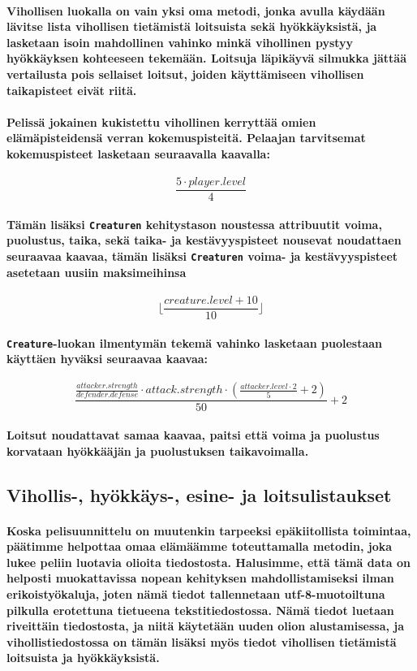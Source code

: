 \documentclass[10pt,a4paper,draft]{article}
\begin{document}
\paragraph{Vihollisen luokalla on vain yksi oma metodi, jonka avulla käydään lävitse lista vihollisen tietämistä loitsuista sekä hyökkäyksistä, ja lasketaan isoin mahdollinen vahinko minkä vihollinen pystyy hyökkäyksen kohteeseen tekemään. Loitsuja läpikäyvä silmukka jättää vertailusta pois sellaiset loitsut, joiden käyttämiseen vihollisen taikapisteet eivät riitä.}
\newpage
\paragraph{Pelissä jokainen kukistettu vihollinen kerryttää omien elämäpisteidensä verran kokemuspisteitä. Pelaajan tarvitsemat kokemuspisteet lasketaan seuraavalla kaavalla:}
\[\frac{5\cdot player.level}{4}\]
\paragraph{Tämän lisäksi \texttt{Creaturen} kehitystason noustessa attribuutit voima, puolustus, taika, sekä taika- ja kestävyyspisteet nousevat noudattaen seuraavaa kaavaa, tämän lisäksi \texttt{Creaturen} voima- ja kestävyyspisteet asetetaan uusiin maksimeihinsa}
\[\lfloor\frac{creature.level+10}{10}\rfloor\]
\paragraph{\texttt{Creature}-luokan ilmentymän tekemä vahinko lasketaan puolestaan käyttäen hyväksi seuraavaa kaavaa:}
\[\frac{\frac{attacker.strength}{defender.defense} \cdot attack.strength \cdot (\frac{attacker.level \cdot 2}{5}+2)}{50}+2\]
\paragraph{Loitsut noudattavat samaa kaavaa, paitsi että voima ja puolustus korvataan hyök\-kää\-jän ja puolustuksen taikavoimalla.}


\subsection{Vihollis-, hyökkäys-, esine- ja loitsulistaukset}
\paragraph{Koska pelisuunnittelu on muutenkin tarpeeksi epäkiitollista toimintaa, päätimme helpottaa omaa elämäämme toteuttamalla metodin, joka lukee peliin luotavia olioita tiedostosta. Halusimme, että tämä data on helposti muokattavissa nopean kehityksen mahdollistamiseksi ilman erikoistyökaluja, joten nämä tiedot tallennetaan utf-8-muotoiltuna pilkulla erotettuna tietueena tekstitiedostossa. Nämä tiedot luetaan riveittäin tiedostosta, ja niitä käytetään uuden olion alustamisessa, ja vihollistiedostossa on tämän lisäksi myös tiedot vihollisen tietämistä loitsuista ja hyökkäyksistä.}
\end{document}
